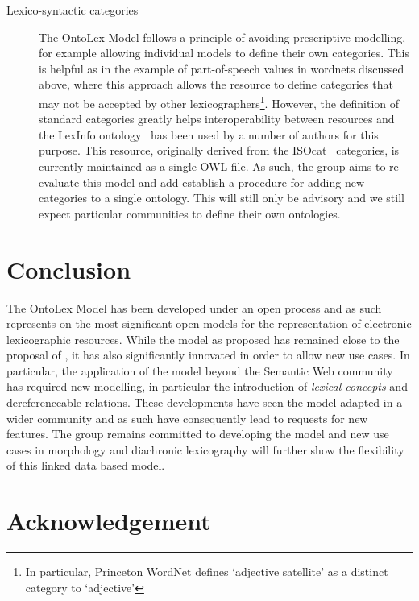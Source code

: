 \documentclass[12pt,a4paper]{elex2017}
\begin{document}
\begin{description}
    \item[Lexico-syntactic categories] The OntoLex Model follows a principle of
        avoiding prescriptive modelling, for example allowing individual models
        to define their own categories. This is helpful as in the example
        of part-of-speech values in wordnets discussed above, where this
        approach allows the resource to define categories that may not be
        accepted by other lexicographers\footnote{In particular, Princeton
        WordNet defines `adjective satellite' as a distinct category to
        `adjective'}. However, the definition of standard categories greatly
        helps interoperability between resources and the LexInfo
        ontology~\citep{cimiano2011lexinfo} has been used by a number of authors
        for this purpose. This resource, originally derived from the
        ISOcat~\citep{kemps2008isocat} categories, is currently maintained as a
        single OWL file. As such, the group aims to re-evaluate this model and
        add establish a procedure for adding new categories to a single
        ontology. This will still only be advisory and we still expect
        particular communities to define their own ontologies.
\end{description}

\section{Conclusion}

The OntoLex Model has been developed under an open process and as such
represents on the most significant open models for the representation of
electronic lexicographic resources. While the model as proposed has remained
close to the proposal of \cite{mccrae2012interchanging}, it has also
significantly innovated in order to allow new use cases. In particular, the
application of the model beyond the Semantic Web community has required new
modelling, in particular the introduction of \emph{lexical concepts} and
dereferenceable relations. These developments have seen the model adapted in a
wider community and as such have consequently lead to requests for new features.
The group remains committed to developing the model and new use cases in
morphology and diachronic lexicography will further show the flexibility of this
linked data based model.

\section*{Acknowledgement} 
\end{document}
